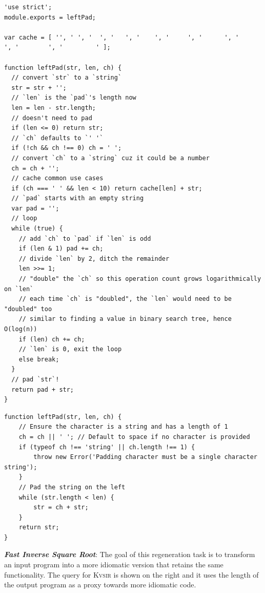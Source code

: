 \documentclass[sigplan,review,anonymous,10pt]{acmart}
\newcommand{\sys}{{\scshape Kv{\textalpha}sir}\xspace}
\newcommand{\heading}[1]{\vspace{2pt}\noindent\textbf{\emph{#1}}:\enspace}
\newcommand{\ttt}[1]{\texttt{#1}\xspace}
\begin{document}
\begin{listing}[htpb]
\begin{verbatim}
'use strict';
module.exports = leftPad;

var cache = [ '', ' ', '  ', '   ', '    ', '     ', '      ', '       ', '        ', '         ' ];

function leftPad(str, len, ch) {
  // convert `str` to a `string`
  str = str + '';
  // `len` is the `pad`'s length now
  len = len - str.length;
  // doesn't need to pad
  if (len <= 0) return str;
  // `ch` defaults to `' '`
  if (!ch && ch !== 0) ch = ' ';
  // convert `ch` to a `string` cuz it could be a number
  ch = ch + '';
  // cache common use cases
  if (ch === ' ' && len < 10) return cache[len] + str;
  // `pad` starts with an empty string
  var pad = '';
  // loop
  while (true) {
    // add `ch` to `pad` if `len` is odd
    if (len & 1) pad += ch;
    // divide `len` by 2, ditch the remainder
    len >>= 1;
    // "double" the `ch` so this operation count grows logarithmically on `len`
    // each time `ch` is "doubled", the `len` would need to be "doubled" too
    // similar to finding a value in binary search tree, hence O(log(n))
    if (len) ch += ch;
    // `len` is 0, exit the loop
    else break;
  }
  // pad `str`!
  return pad + str;
}
  \end{verbatim}
\caption{The original \ttt{leftPad} library.}
\end{listing}

\begin{listing}[htpb]
  \begin{verbatim}
function leftPad(str, len, ch) {
    // Ensure the character is a string and has a length of 1
    ch = ch || ' '; // Default to space if no character is provided
    if (typeof ch !== 'string' || ch.length !== 1) {
        throw new Error('Padding character must be a single character string');
    }
    // Pad the string on the left
    while (str.length < len) {
        str = ch + str;
    }
    return str;
}
  \end{verbatim}
  \caption{The output of \sys, having regenerated \ttt{leftPad}.}
\end{listing}

\heading{Fast Inverse Square Root}
The goal of this regeneration task is to transform an input 
program into a more idiomatic version that retains the same functionality.
The query for \sys is shown on the right and it uses the length of the output program as a proxy towards 
more idiomatic code.
\end{document}
